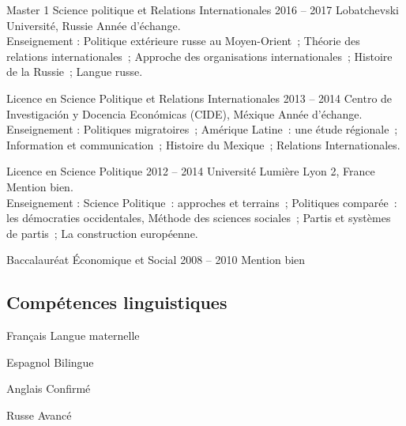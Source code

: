 \documentclass[30pt, french]{tccv}
\begin{document}
\begin{upshape}
\begin{education}
\vspace{0.5cm}
\item[Master 1 Science politique et Relations Internationales]{2016 -- 2017}
     {Lobatchevski Université, Russie}
     {     
     Année d’échange.\\
     \sloppy
     Enseignement : Politique extérieure russe au Moyen-Orient ; 
     Théorie des relations internationales ; 
     Approche des organisations internationales ; 
     Histoire de la Russie ; 
     Langue russe.
     }
     
   


\vspace{0.5cm}
\item[Licence en Science Politique et Relations Internationales]{2013 -- 2014}
     {Centro de Investigación y Docencia Económicas (CIDE), Méxique}
     {Année d’échange.\\
     Enseignement : Politiques migratoires ; Amérique Latine : une étude régionale ; Information et communication ; Histoire du Mexique ; Relations Internationales.
     }

     
\vspace{0.5cm}    
\item[Licence en Science Politique ]{2012 -- 2014}
     {Université Lumière Lyon 2, France}
     {Mention bien.\\
     Enseignement : Science Politique : approches et terrains ; Politiques comparée : les démocraties occidentales, Méthode des sciences sociales ; Partis et systèmes de partis ; La construction européenne. 
     }

     
\vspace{0.5cm}
\item[Baccalauréat Économique et Social]{2008 -- 2010}
     {}
     {Mention bien}


\end{education}


%
%


\begin{competence}


\section{Compétences linguistiques}
\fontsize{15pt}{1.6em}\color{text}\bodyfontlight\upshape\selectfont %
\begin{factlist}
\item{Français} {Langue maternelle}	
\item{Espagnol} {Bilingue}	
\item{Anglais} {Confirmé}	
\item{Russe} {Avancé}
\end{factlist}


\end{competence}
\end{upshape}
\end{document}
